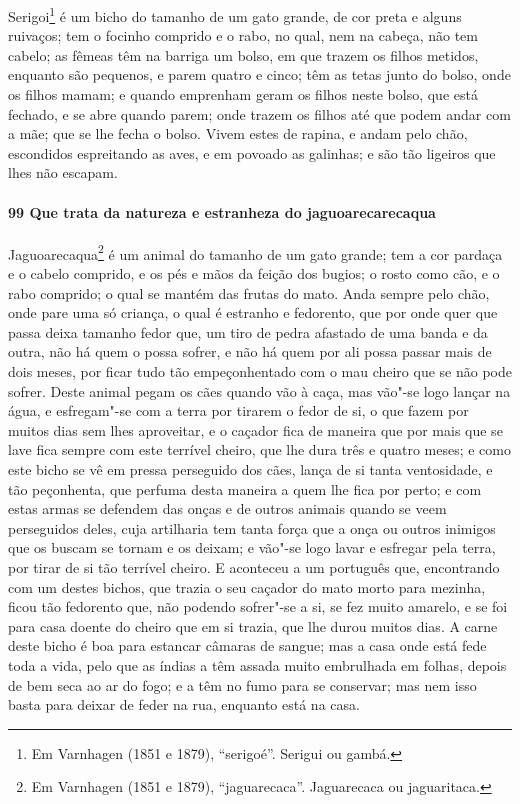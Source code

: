 \begin{linenumbers}
Serigoi\footnote{ Em Varnhagen (1851 e 1879), ``serigoé''. Serigui ou gambá.} é um bicho
do tamanho de um gato grande, de cor preta e alguns ruivaços; tem o focinho comprido e o
rabo, no qual, nem na cabeça, não tem cabelo; as fêmeas têm na barriga um bolso, em que
trazem os filhos metidos, enquanto são pequenos, e parem quatro e cinco; têm as tetas
junto do bolso, onde os filhos mamam; e quando emprenham geram os filhos neste bolso, que
está fechado, e se abre quando parem; onde trazem os filhos até que podem andar com a mãe;
que se lhe fecha o bolso. Vivem estes de rapina, e andam pelo chão, escondidos espreitando
as aves, e em povoado as galinhas; e são tão ligeiros que lhes não escapam.

\paragraph{99 Que trata da natureza e estranheza do jaguoarecarecaqua}\quad
Jaguoarecaqua\footnote{ Em Varnhagen (1851 e 1879), ``jaguarecaca''. Jaguarecaca ou
jaguaritaca.} é um animal do tamanho de um gato grande; tem a cor pardaça e o cabelo
comprido, e os pés e mãos da feição dos bugios; o rosto como cão, e o rabo comprido; o
qual se mantém das frutas do mato. Anda sempre pelo chão, onde pare uma só criança, o qual
é estranho e fedorento, que por onde quer que passa deixa tamanho fedor que, um tiro de
pedra afastado de uma banda e da outra, não há quem o possa sofrer, e não há quem por ali
possa passar mais de dois meses, por ficar tudo tão empeçonhentado com o mau cheiro que se
não pode sofrer. Deste animal pegam os cães quando vão à caça, mas vão"-se logo lançar na
água, e esfregam"-se com a terra por tirarem o fedor de si, o que fazem por muitos dias sem
lhes aproveitar, e o caçador fica de maneira que por mais que se lave fica sempre com este
terrível cheiro, que lhe dura três e quatro meses; e como este bicho se vê em pressa
perseguido dos cães, lança de si tanta ventosidade, e tão peçonhenta, que perfuma desta
maneira a quem lhe fica por perto; e com estas armas se defendem das onças e de outros
animais quando se veem perseguidos deles, cuja artilharia tem tanta força que a onça ou
outros inimigos que os buscam se tornam e os deixam; e vão"-se logo lavar e esfregar pela
terra, por tirar de si tão terrível cheiro. E aconteceu a um português que, encontrando
com um destes bichos, que trazia o seu caçador do mato morto para mezinha, ficou tão
fedorento que, não podendo sofrer"-se a si, se fez muito amarelo, e se foi para casa doente
do cheiro que em si trazia, que lhe durou muitos dias. A carne deste bicho é boa para
estancar câmaras de sangue; mas a casa onde está fede toda a vida, pelo que as índias a
têm assada muito embrulhada em folhas, depois de bem seca ao ar do fogo; e a têm no fumo
para se conservar; mas nem isso basta para deixar de feder na rua, enquanto está na casa.


\end{linenumbers}
